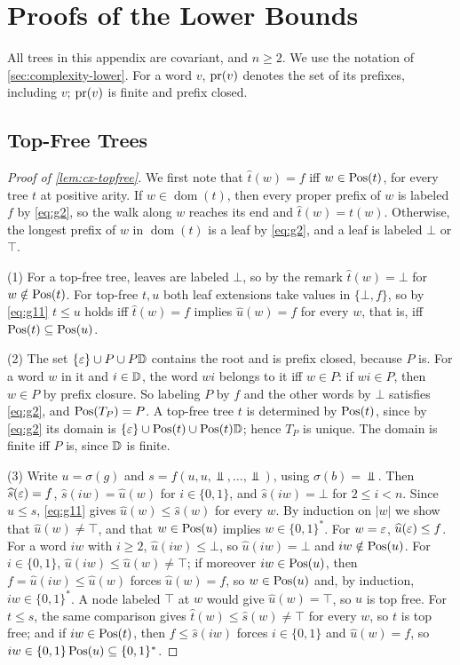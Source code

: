 \section{Proofs of the Lower Bounds}
\label{app:lower}

All trees in this appendix are covariant, and $n\ge2$. We use the notation
of \cref{sec:complexity-lower}. For a word $v$, $\operatorname{pr}(v)$ denotes the set of its
prefixes, including $v$; $\operatorname{pr}(v)$ is finite and prefix closed.

\subsection{Top-Free Trees}

\begin{proof}[Proof of \cref{lem:cx-topfree}]
We first note that $\widehat t(w)=f$ iff $w\in\operatorname{Pos}(t)$, for every tree $t$ at
positive arity. If $w\in\operatorname{dom}(t)$, then every proper prefix of $w$
is labeled $f$ by \eqref{eq:g2}, so the walk along $w$ reaches its end and
$\widehat t(w)=t(w)$. Otherwise, the longest prefix of $w$ in
$\operatorname{dom}(t)$ is a leaf by \eqref{eq:g2}, and a leaf is labeled $\bot$ or
$\top$.

(1) For a top-free tree, leaves are labeled $\bot$, so by the remark
$\widehat t(w)=\bot$ for $w\notin\operatorname{Pos}(t)$. For top-free $t,u$ both leaf extensions
take values in $\{\bot,f\}$, so by \eqref{eq:g11} $t\le u$ holds iff
$\widehat t(w)=f$ implies $\widehat u(w)=f$ for every $w$, that is, iff
$\operatorname{Pos}(t)\subseteq\operatorname{Pos}(u)$.

(2) The set $\{\varepsilon\}\cup P\cup P\mathbb{D}$ contains the root and is prefix closed,
because $P$ is. For a word $w$ in it and $i\in\mathbb{D}$, the word $wi$ belongs to it
iff $w\in P$: if $wi\in P$, then $w\in P$ by prefix closure. So labeling $P$ by
$f$ and the other words by $\bot$ satisfies \eqref{eq:g2}, and $\operatorname{Pos}(T_P)=P$.
A top-free tree $t$ is determined by $\operatorname{Pos}(t)$, since by \eqref{eq:g2} its
domain is $\{\varepsilon\}\cup\operatorname{Pos}(t)\cup\operatorname{Pos}(t)\mathbb{D}$; hence $T_P$ is unique. The
domain is finite iff $P$ is, since $\mathbb{D}$ is finite.

(3) Write $u=\sigma(g)$ and $s=f(u,u,\Bot,\ldots,\Bot)$, using $\sigma(b)=\Bot$.
Then $\widehat s(\varepsilon)=f$, $\widehat s(iw)=\widehat u(w)$ for $i\in\{0,1\}$, and
$\widehat s(iw)=\bot$ for $2\le i<n$. Since $u\le s$, \eqref{eq:g11} gives
$\widehat u(w)\le\widehat s(w)$ for every $w$. By induction on $|w|$ we show that
$\widehat u(w)\ne\top$, and that $w\in\operatorname{Pos}(u)$ implies $w\in\{0,1\}^*$. For
$w=\varepsilon$, $\widehat u(\varepsilon)\le f$. For a word $iw$ with $i\ge2$,
$\widehat u(iw)\le\bot$, so $\widehat u(iw)=\bot$ and $iw\notin\operatorname{Pos}(u)$. For
$i\in\{0,1\}$, $\widehat u(iw)\le\widehat u(w)\ne\top$; if moreover $iw\in\operatorname{Pos}(u)$,
then $f=\widehat u(iw)\le\widehat u(w)$ forces $\widehat u(w)=f$, so $w\in\operatorname{Pos}(u)$
and, by induction, $iw\in\{0,1\}^*$. A node labeled $\top$ at $w$ would give
$\widehat u(w)=\top$, so $u$ is top free. For $t\le s$, the same comparison gives
$\widehat t(w)\le\widehat s(w)\ne\top$ for every $w$, so $t$ is top free; and if
$iw\in\operatorname{Pos}(t)$, then $f\le\widehat s(iw)$ forces $i\in\{0,1\}$ and
$\widehat u(w)=f$, so $iw\in\{0,1\}\operatorname{Pos}(u)\subseteq\{0,1\}^*$.


\end{proof}
